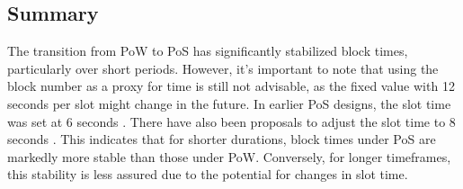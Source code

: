 \subsection{Summary}
The transition from PoW to PoS has significantly stabilized block times,
particularly over short periods. However, it's important to note that using
the block number as a proxy for time is still not advisable, as the fixed value
with 
12 seconds per slot might change in the future. In earlier PoS designs, the
slot time was set at 6 seconds \cite{block_time_6_to_12_sec}. There have
also been proposals to adjust the slot time to 8 seconds
\cite{proposed_block_time_8_seconds}. This indicates that for shorter
durations, block times under PoS are markedly more stable than those under
PoW. Conversely, for longer timeframes, this stability is less assured due
to the potential for changes in slot time.


